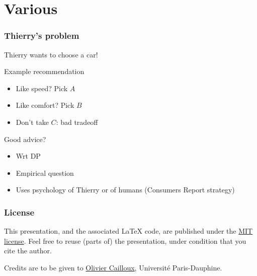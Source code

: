 \documentclass[french,english]{beamer}
\begin{document}
\section{Various}
\begin{frame}
	\frametitle{Thierry’s problem}
	Thierry wants to choose a car!
	\begin{block}{Example recommendation}
		\begin{itemize}
			\item Like speed? Pick $A$
			\item Like comfort? Pick $B$
			\item Don’t take $C$: bad tradeoff
		\end{itemize}
	\end{block}
	\begin{block}{Good advice?}
		\begin{itemize}
			\item Wrt \ac{DP}
			\item Empirical question
			\item Uses psychology of Thierry or of humans (Consumers Report strategy)
		\end{itemize}
	\end{block}
\end{frame}

\clearpage{}
\begin{frame}[plain]
	\frametitle{License}
	This presentation, and the associated \LaTeX{} code, are published under the \href{http://opensource.org/licenses/MIT}{MIT license}. Feel free to reuse (parts of) the presentation, under condition that you cite the author.
	
	Credits are to be given to \href{http://www.lamsade.dauphine.fr/~ocailloux/}{Olivier Cailloux}, Université Paris-Dauphine.
\end{frame}
\addtocounter{framenumber}{-1}
\end{document}
